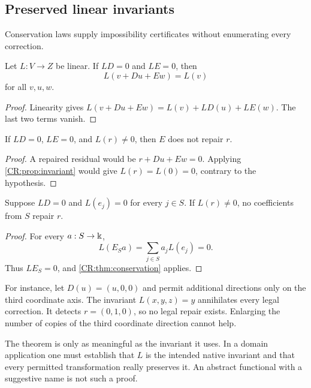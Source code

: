 \subsection{Preserved linear invariants}
Conservation laws supply impossibility certificates without enumerating every correction.

\begin{CRproposition}\label{CR:prop:invariant}
Let $L:V\to Z$ be linear. If $LD=0$ and $LE=0$, then
\[
L(v+Du+Ew)=L(v)
\]
for all $v,u,w$.
\end{CRproposition}
\begin{proof}
Linearity gives $L(v+Du+Ew)=L(v)+LD(u)+LE(w)$. The last two terms vanish.
\end{proof}

\begin{CRtheorem}\label{CR:thm:conservation}
If $LD=0$, $LE=0$, and $L(r)\ne0$, then $E$ does not repair $r$.
\end{CRtheorem}
\begin{proof}
A repaired residual would be $r+Du+Ew=0$. Applying \cref{CR:prop:invariant} would give $L(r)=L(0)=0$, contrary to the hypothesis.
\end{proof}

\begin{CRcorollary}\label{CR:cor:menu-conservation}
Suppose $LD=0$ and $L(e_j)=0$ for every $j\in S$. If $L(r)\ne0$, no coefficients from $S$ repair $r$.
\end{CRcorollary}
\begin{proof}
For every $a:S\to\Bbbk$,
\[
L(E_Sa)=\sum_{j\in S}a_jL(e_j)=0.
\]
Thus $LE_S=0$, and \cref{CR:thm:conservation} applies.
\end{proof}

For instance, let $D(u)=(u,0,0)$ and permit additional directions only on the third coordinate axis. The invariant $L(x,y,z)=y$ annihilates every legal correction. It detects $r=(0,1,0)$, so no legal repair exists. Enlarging the number of copies of the third coordinate direction cannot help.

The theorem is only as meaningful as the invariant it uses. In a domain application one must establish that $L$ is the intended native invariant and that every permitted transformation really preserves it. An abstract functional with a suggestive name is not such a proof.


